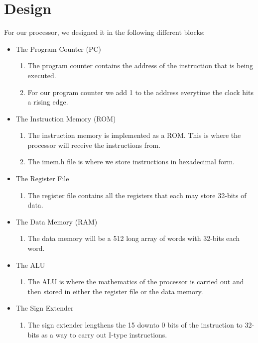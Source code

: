 \documentclass[paper=letter, fontsize=11pt]{scrartcl} %
\numberwithin{equation}{section}
\numberwithin{figure}{section}
\numberwithin{table}{section}
\begin{document}
\section{Design}
\begin{center}
For our processor, we designed it in the following different blocks:
\end{center}
\begin{itemize}
	\item The Program Counter (PC)
	\begin{enumerate}
		\item The program counter contains the address of the instruction that is being executed.
		\item For our program counter we add 1 to the address everytime the clock hits a rising edge.
	\end{enumerate}
	\item The Instruction Memory (ROM)
	\begin{enumerate}
		\item The instruction memory is implemented as a ROM. This is where the processor will receive the instructions from.
		\item The imem.h file is where we store instructions in hexadecimal form. 
	\end{enumerate}
	\item The Register File
	\begin{enumerate}
		\item The register file contains all the registers that each may store 32-bits of data.
	\end{enumerate}
	\item The Data Memory (RAM)
	\begin{enumerate}
		\item The data memory will be a 512 long array of words with 32-bits each word.
	\end{enumerate}
	\item The ALU
	\begin{enumerate}
		\item The ALU is where the mathematics of the processor is carried out and then stored in either the register file or the data memory.
	\end{enumerate}
	\item The Sign Extender
	\begin{enumerate}
		\item The sign extender lengthens the 15 downto 0 bits of the instruction to 32-bits as a way to carry out I-type instructions.
	\end{enumerate}

\end{itemize}
\end{document}
